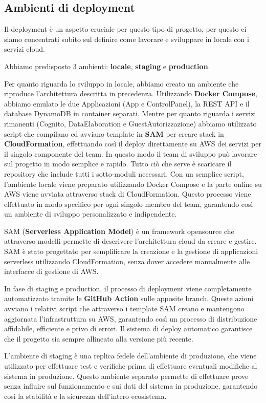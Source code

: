 \subsection{Ambienti di deployment}

Il deployment è un aspetto cruciale per questo tipo di progetto, per questo ci siamo concentrati subito sul definire come lavorare e sviluppare in locale con i servizi cloud.

Abbiamo predisposto 3 ambienti: \textbf{locale}, \textbf{staging} e \textbf{production}.

Per quanto riguarda lo sviluppo in locale, abbiamo creato un ambiente che riproduce l'architettura descritta in precedenza. 
Utilizzando \textbf{Docker Compose}, abbiamo emulato le due Applicazioni (App e ControlPanel), la REST API e il database DynamoDB in container separati. Mentre per quanto riguarda i servizi rimanenti (Cognito, DataElaboration e GuestAutorizzazione) abbiamo utilizzato script che compilano ed avviano template in \textbf{SAM} per creare stack in \textbf{CloudFormation}, effettuando così il deploy direttamente su AWS dei servizi per il singolo componente del team. 
In questo modo il team di sviluppo può lavorare sul progetto in modo semplice e rapido. Tutto ciò che serve è scaricare il repository che include tutti i sotto-moduli necessari. Con un semplice script, l'ambiente locale viene preparato utilizzando Docker Compose e la parte online su AWS viene avviata attraverso stack di CloudFormation. Questo processo viene effettuato in modo specifico per ogni singolo membro del team, garantendo così un ambiente di sviluppo personalizzato e indipendente.

SAM (\textbf{Serverless Application Model}) è un framework opensource che attraverso modelli permette di descrivere l'architettura cloud da creare e gestire. SAM è stato progettato per semplificare la creazione e la gestione di applicazioni serverless utilizzando CloudFormation, senza dover accedere manualmente alle interfacce di gestione di AWS.

In fase di staging e production, il processo di deployment viene completamente automatizzato tramite le \textbf{GitHub Action} sulle apposite branch. Queste azioni avviano i relativi script che attraverso i template SAM creano e mantengono aggiornata l'infrastruttura su AWS, garantendo così un processo di distribuzione affidabile, efficiente e privo di errori. Il sistema di deploy automatico garantisce che il progetto sia sempre allineato alla versione più recente.

L'ambiente di staging è una replica fedele dell'ambiente di produzione, che viene utilizzato per effettuare test e verifiche prima di effettuare eventuali modifiche al sistema in produzione. Questo ambiente separato permette di effettuare prove senza influire sul funzionamento e sui dati del sistema in produzione, garantendo così la stabilità e la sicurezza dell'intero ecosistema.

\newpage
